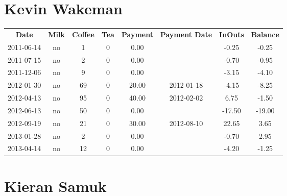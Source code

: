 \section{Kevin Wakeman}

\begin{center}
\begin{tabular}{cccccccc}
\textbf{Date} & \textbf{Milk} & \textbf{Coffee} & \textbf{Tea} & \textbf{Payment} & \textbf{Payment Date} & \textbf{InOuts} & \textbf{Balance} \\
2011-06-14 & no &  1 & 0 &  0.00 &  &  -0.25 &  -0.25\\ 
2011-07-15 & no &  2 & 0 &  0.00 &  &  -0.70 &  -0.95\\ 
2011-12-06 & no &  9 & 0 &  0.00 &  &  -3.15 &  -4.10\\ 
2012-01-30 & no & 69 & 0 & 20.00 & 2012-01-18 &  -4.15 &  -8.25\\ 
2012-04-13 & no & 95 & 0 & 40.00 & 2012-02-02 &   6.75 &  -1.50\\ 
2012-06-13 & no & 50 & 0 &  0.00 &  & -17.50 & -19.00\\ 
2012-09-19 & no & 21 & 0 & 30.00 & 2012-08-10 &  22.65 &   3.65\\ 
2013-01-28 & no &  2 & 0 &  0.00 &  &  -0.70 &   2.95\\ 
2013-04-14 & no & 12 & 0 &  0.00 &  &  -4.20 &  -1.25
\end{tabular}
\end{center}

\section{Kieran Samuk}

